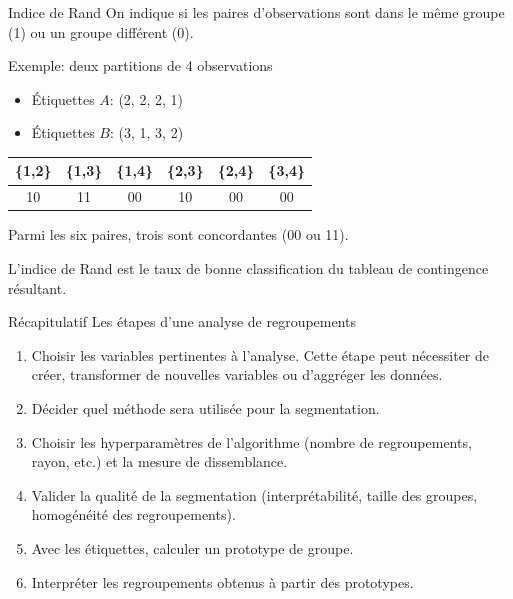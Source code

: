 \documentclass[
  ignorenonframetext,
]{beamer}
\providecommand{\tightlist}{%
  \setlength{\itemsep}{0pt}\setlength{\parskip}{0pt}}\usepackage{longtable,booktabs,array}
\begin{document}
\begin{frame}{Indice de Rand}
\protect\hypertarget{indice-de-rand}{}
On indique si les paires d'observations sont dans le même groupe (1) ou
un groupe différent (0).

Exemple: deux partitions de 4 observations

\begin{itemize}
\tightlist
\item
  Étiquettes \(A\): (2, 2, 2, 1)
\item
  Étiquettes \(B\): (3, 1, 3, 2)
\end{itemize}

\begin{longtable}[]{@{}cccccc@{}}
\toprule()
\{1,2\} & \{1,3\} & \{1,4\} & \{2,3\} & \{2,4\} & \{3,4\} \\
\midrule()
\endhead
10 & 11 & 00 & 10 & 00 & 00 \\
\bottomrule()
\end{longtable}

Parmi les six paires, trois sont concordantes (00 ou 11).

L'indice de Rand est le taux de bonne classification du tableau de
contingence résultant.
\end{frame}

\begin{frame}{Récapitulatif}
\protect\hypertarget{ruxe9capitulatif}{}
Les étapes d'une analyse de regroupements

\begin{enumerate}
\tightlist
\item
  Choisir les variables pertinentes à l'analyse. Cette étape peut
  nécessiter de créer, transformer de nouvelles variables ou d'aggréger
  les données.
\item
  Décider quel méthode sera utilisée pour la segmentation.
\item
  Choisir les hyperparamètres de l'algorithme (nombre de regroupements,
  rayon, etc.) et la mesure de dissemblance.
\item
  Valider la qualité de la segmentation (interprétabilité, taille des
  groupes, homogénéité des regroupements).
\item
  Avec les étiquettes, calculer un prototype de groupe.
\item
  Interpréter les regroupements obtenus à partir des prototypes.
\end{enumerate}
\end{frame}
\end{document}
